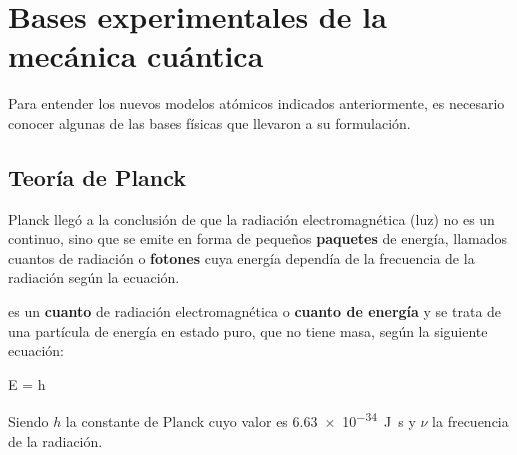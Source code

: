


\section{Bases experimentales de la mecánica cuántica}

Para entender los nuevos modelos atómicos indicados anteriormente, es necesario conocer algunas de las bases físicas que llevaron a su formulación.

\subsection{Teoría de Planck}\label{subsec:teoria-de-planck}

Planck llegó a la conclusión de que la radiación electromagnética (luz) no es un continuo, sino que se emite en forma de pequeños \textbf{paquetes} de energía, llamados cuantos de radiación o \textbf{fotones} cuya energía dependía de la frecuencia de la radiación según la ecuación.
\begin{definition}[Fotón]
    es un \textbf{cuanto} de radiación electromagnética o \textbf{cuanto de energía} y se trata de una partícula de energía en estado puro, que no tiene masa, según la siguiente ecuación:
    \begin{centeredequation}
        E = h\ \nu\label{eq:energia_relativista}
    \end{centeredequation}
    Siendo \(h\) la constante de Planck cuyo valor es \SI{6.63e-34}{\joule\s} y \(\nu\) la frecuencia de la radiación.
\end{definition}

